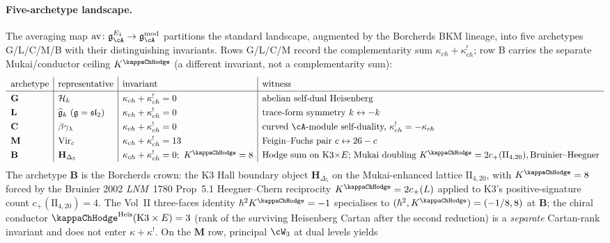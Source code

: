\paragraph{Five-archetype landscape.}
The averaging map
$\mathrm{av}\colon \mathfrak g^{E_1}_\cA \to
\mathfrak g^{\mathrm{mod}}_\cA$ partitions the standard
landscape, augmented by the Borcherds BKM lineage, into five
archetypes G/L/C/M/B with their distinguishing invariants. Rows
G/L/C/M record the complementarity sum $\kappa_{ch} + \kappa_{ch}^!$;
row B carries the separate Mukai/conductor ceiling
$K^{\kappaChHodge}$ (a different invariant, not a complementarity
sum):
\[
\renewcommand{\arraystretch}{1.3}
\begin{array}{l|l|l|l}
\text{archetype} & \text{representative} & \text{invariant} &
 \text{witness} \\
\hline
\mathbf{G} & \cH_k & \kappa_{ch} + \kappa_{ch}^! = 0 &
 \text{abelian self-dual Heisenberg} \\
\mathbf{L} & \widehat{\fg}_k\ (\fg = \mathfrak{sl}_2) &
 \kappa_{ch} + \kappa_{ch}^! = 0 &
 \text{trace-form symmetry } k \leftrightarrow -k \\
\mathbf{C} & \beta\gamma_\lambda &
 \kappa_{ch} + \kappa_{ch}^! = 0 &
 \text{curved $\cA$-module self-duality, } \kappa_{ch}^! = -\kappa_{ch} \\
\mathbf{M} & \mathrm{Vir}_c & \kappa_{ch} + \kappa_{ch}^! = 13 &
 \text{Feigin--Fuchs pair } c \leftrightarrow 26 - c \\
\mathbf{B} & \mathbf H_{\Delta_5} &
 \kappa_{ch} + \kappa_{ch}^! = 0;\ K^{\kappaChHodge} = 8 &
 \text{Hodge sum on K3$\times E$; Mukai doubling } K^{\kappaChHodge}
 = 2c_+(\mathrm{II}_{4,20}),
 \text{Bruinier--Heegner}
\end{array}
\]
The archetype $\mathbf{B}$ is the Borcherds crown: the K3 Hall
boundary object $\mathbf H_{\Delta_5}$ on the Mukai-enhanced
lattice $\mathrm{II}_{4,20}$, with $K^{\kappaChHodge} = 8$ forced by the
Bruinier 2002 \emph{LNM}~1780 Prop~5.1 Heegner--Chern reciprocity
$K^{\kappaChHodge} = 2 c_+(L)$ applied to K3's positive-signature count
$c_+(\mathrm{II}_{4,20}) = 4$. The Vol~II three-faces identity
$\hbar^2 K^{\kappaChHodge} = -1$ specialises to
$(\hbar^2, K^{\kappaChHodge}) = (-1/8, 8)$ at
$\mathbf{B}$; the chiral conductor
${\kappaChHodge}^{\mathrm{Heis}}(\mathrm{K3}\times E) = 3$
(rank of the surviving Heisenberg Cartan after the second reduction)
is a \emph{separate} Cartan-rank invariant and does not enter
$\kappa + \kappa^!$.
On the $\mathbf{M}$ row, principal $\cW_3$ at dual levels yields
